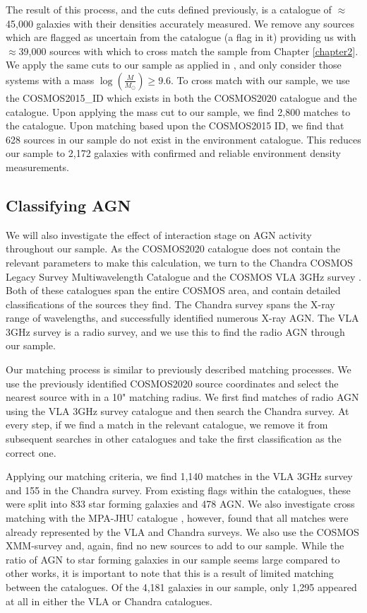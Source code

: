 The result of this process, and the cuts defined previously, is a catalogue of $\approx$45,000 galaxies with their densities accurately measured. We remove any sources which are flagged as uncertain from the catalogue (a flag in it) providing us with $\approx$39,000 sources with which to cross match the sample from Chapter \ref{chapter2}. We apply the same cuts to our sample as applied in \citet{2017ApJ...837...16D}, and only consider those systems with a mass $\log(\frac{M}{M_\odot}) \geq 9.6$. To cross match with our sample, we use the COSMOS2015\_ID which exists in both the COSMOS2020 catalogue and the \citet{2017ApJ...837...16D} catalogue. Upon applying the mass cut to our sample, we find 2,800 matches to the \citet{2017ApJ...837...16D} catalogue. Upon matching based upon the COSMOS2015 ID, we find that 628 sources in our sample do not exist in the environment catalogue. This reduces our sample to 2,172 galaxies with confirmed and reliable environment density measurements.

\subsection{Classifying AGN}\label{sec:agn-clsf}
\noindent We will also investigate the effect of interaction stage on AGN activity throughout our sample. As the COSMOS2020 catalogue does not contain the relevant parameters to make this calculation, we turn to the Chandra COSMOS Legacy Survey Multiwavelength Catalogue \citep{2016ApJ...817...34M} and the COSMOS VLA 3GHz survey \citep{2017A&A...602A...6S, 2017A&A...602A...3D}. Both of these catalogues span the entire COSMOS area, and contain detailed classifications of the sources they find. The Chandra survey spans the X-ray range of wavelengths, and successfully identified numerous X-ray AGN. The VLA 3GHz survey is a radio survey, and we use this to find the radio AGN through our sample. 

Our matching process is similar to previously described matching processes. We use the previously identified COSMOS2020 source coordinates and select the nearest source with in a 10" matching radius. We first find matches of radio AGN using the VLA 3GHz survey catalogue and then search the Chandra survey. At every step, if we find a match in the relevant catalogue, we remove it from subsequent searches in other catalogues and take the first classification as the correct one.

Applying our matching criteria, we find 1,140 matches in the VLA 3GHz survey and 155 in the Chandra survey. From existing flags within the catalogues, these were split into 833 star forming galaxies and 478 AGN. We also investigate cross matching with the MPA-JHU catalogue \citep{2003MNRAS.341...33K, 2004MNRAS.351.1151B, 2007ApJS..173..267S}, however, found that all matches were already represented by the VLA and Chandra surveys. We also use the COSMOS XMM-survey and, again, find no new sources to add to our sample. While the ratio of AGN to star forming galaxies in our sample seems large compared to other works, it is important to note that this is a result of limited matching between the catalogues. Of the 4,181 galaxies in our sample, only 1,295 appeared at all in either the VLA or Chandra catalogues.

